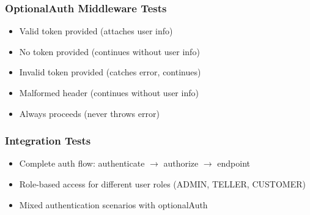 \subsubsection{OptionalAuth Middleware Tests}
\begin{itemize}
    \item Valid token provided (attaches user info)
    \item No token provided (continues without user info)
    \item Invalid token provided (catches error, continues)
    \item Malformed header (continues without user info)
    \item Always proceeds (never throws error)
\end{itemize}

\subsubsection{Integration Tests}
\begin{itemize}
    \item Complete auth flow: authenticate $\rightarrow$ authorize $\rightarrow$ endpoint
    \item Role-based access for different user roles (ADMIN, TELLER, CUSTOMER)
    \item Mixed authentication scenarios with optionalAuth
\end{itemize}
